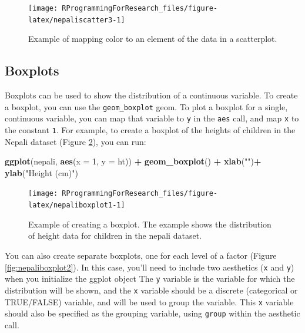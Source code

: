 \documentclass[]{book}
\makeatletter
\newenvironment{Shaded}{\begin{snugshade}}{\end{snugshade}}
\newcommand{\KeywordTok}[1]{\textcolor[rgb]{0.13,0.29,0.53}{\textbf{#1}}}
\newcommand{\DataTypeTok}[1]{\textcolor[rgb]{0.13,0.29,0.53}{#1}}
\newcommand{\DecValTok}[1]{\textcolor[rgb]{0.00,0.00,0.81}{#1}}
\newcommand{\StringTok}[1]{\textcolor[rgb]{0.31,0.60,0.02}{#1}}
\newcommand{\OperatorTok}[1]{\textcolor[rgb]{0.81,0.36,0.00}{\textbf{#1}}}
\newcommand{\NormalTok}[1]{#1}
\newenvironment{kframe}{%
\medskip{}
\setlength{\fboxsep}{.8em}
 \def\at@end@of@kframe{}%
 \ifinner\ifhmode%
  \def\at@end@of@kframe{\end{minipage}}%
  \begin{minipage}{\columnwidth}%
 \fi\fi%
 \def\FrameCommand##1{\hskip\@totalleftmargin \hskip-\fboxsep
 \colorbox{shadecolor}{##1}\hskip-\fboxsep
     \hskip-\linewidth \hskip-\@totalleftmargin \hskip\columnwidth}%
 \MakeFramed {\advance\hsize-\width
   \@totalleftmargin\z@ \linewidth\hsize
   \@setminipage}}%
 {\par\unskip\endMakeFramed%
 \at@end@of@kframe}
\renewenvironment{Shaded}{\begin{kframe}}{\end{kframe}}
\theoremstyle{definition}
\theoremstyle{definition}
\theoremstyle{definition}
\theoremstyle{remark}
\makeatother
\begin{document}
\begin{figure}

{\centering \texttt{[image: RProgrammingForResearch\_files/figure-latex/nepaliscatter3-1]} 

}

\caption{Example of mapping color to an element of the data in a scatterplot.}\label{fig:nepaliscatter3}
\end{figure}

\subsection{Boxplots}\label{boxplots}

Boxplots can be used to show the distribution of a continuous variable.
To create a boxplot, you can use the \texttt{geom\_boxplot} geom. To
plot a boxplot for a single, continuous variable, you can map that
variable to \texttt{y} in the \texttt{aes} call, and map \texttt{x} to
the constant \texttt{1}. For example, to create a boxplot of the heights
of children in the Nepali dataset (Figure \ref{fig:nepaliboxplot1}), you
can run:

\begin{Shaded}
\begin{Highlighting}[]
\KeywordTok{ggplot}\NormalTok{(nepali, }\KeywordTok{aes}\NormalTok{(}\DataTypeTok{x =} \DecValTok{1}\NormalTok{, }\DataTypeTok{y =}\NormalTok{ ht)) }\OperatorTok{+}\StringTok{ }
\StringTok{  }\KeywordTok{geom_boxplot}\NormalTok{() }\OperatorTok{+}\StringTok{ }
\StringTok{  }\KeywordTok{xlab}\NormalTok{(}\StringTok{""}\NormalTok{)}\OperatorTok{+}\StringTok{ }\KeywordTok{ylab}\NormalTok{(}\StringTok{"Height (cm)"}\NormalTok{)}
\end{Highlighting}
\end{Shaded}

\begin{figure}

{\centering \texttt{[image: RProgrammingForResearch\_files/figure-latex/nepaliboxplot1-1]} 

}

\caption{Example of creating a boxplot. The example shows the distribution of height data for children in the nepali dataset.}\label{fig:nepaliboxplot1}
\end{figure}

You can also create separate boxplots, one for each level of a factor
(Figure \ref{fig:nepaliboxplot2}). In this case, you'll need to include
two aesthetics (\texttt{x} and \texttt{y}) when you initialize the
ggplot object The \texttt{y} variable is the variable for which the
distribution will be shown, and the \texttt{x} variable should be a
discrete (categorical or TRUE/FALSE) variable, and will be used to group
the variable. This \texttt{x} variable should also be specified as the
grouping variable, using \texttt{group} within the aesthetic call.
\end{document}
